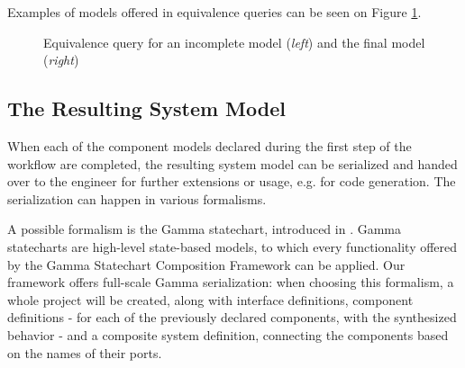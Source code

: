 Examples of models offered in equivalence queries can be seen on Figure \ref{fig_methodology_eqex}.

\begin{figure}[H] 
	\centering
	\caption{Equivalence query for an incomplete model (\textit{left}) and the final model (\textit{right})}
	\label{fig_methodology_eqex}
\end{figure}

\subsection{The Resulting System Model} \label{subs_resultingmodel}
When each of the component models declared during the first step of the workflow are completed, the resulting system model can be serialized and handed over to the engineer for further extensions or usage, e.g. for code generation. The serialization can happen in various formalisms.

A possible formalism is the Gamma statechart, introduced in \cite{DBLP:conf/icse/MolnarGVMV18}. Gamma statecharts are high-level state-based models, to which every functionality offered by the Gamma Statechart Composition Framework can be applied. Our framework offers full-scale Gamma serialization: when choosing this formalism, a whole project will be created, along with interface definitions, component definitions - for each of the previously declared components, with the synthesized behavior - and a composite system definition, connecting the components based on the names of their ports.

